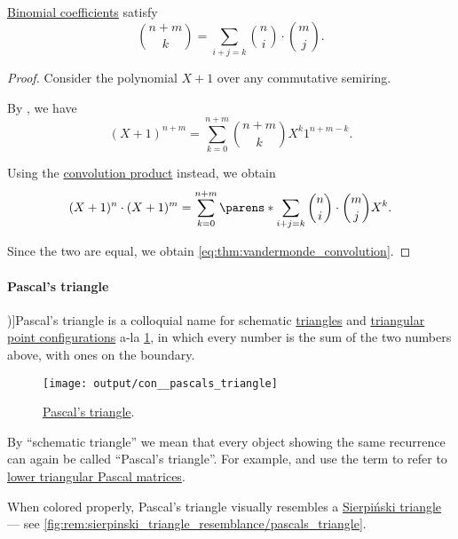 \begin{theorem}\label{thm:vandermonde_convolution}
  \hyperref[def:binomial_coefficient]{Binomial coefficients} satisfy
  \begin{equation}\label{eq:thm:vandermonde_convolution}
    \binom {n + m} k = \sum_{i+j=k} \binom n i \cdot \binom m j.
  \end{equation}
\end{theorem}
\begin{proof}
  Consider the polynomial \( X + 1 \) over any commutative semiring.

  By , we have
  \begin{equation*}
    (X + 1)^{n+m} = \sum_{k=0}^{n+m} \binom {n+m} k X^k 1^{n+m-k}.
  \end{equation*}

  Using the \hyperref[def:semigroup_algebra]{convolution product} instead, we obtain
  \begin{equation*}
    (X + 1)^n \cdot (X + 1)^m = \sum_{k=0}^{n+m} \parens*{ \sum_{i+j=k} \binom n i \cdot \binom m j } X^k.
  \end{equation*}

  Since the two are equal, we obtain \eqref{eq:thm:vandermonde_convolution}.
\end{proof}

\paragraph{Pascal's triangle}

\begin{concept}\label{con:pascals_triangle}
  \term[ru=треугольник Паскаля (\cite[\S 5.3.4]{Новиков2013ДискретнаяМатематика})]{Pascal's triangle} is a colloquial name for schematic \hyperref[def:triangle]{triangles} and \hyperref[def:triangular_point_configuration]{triangular point configurations} a-la \cref{fig:con:pascals_triangle}, in which every number is the sum of the two numbers above, with ones on the boundary.

  \begin{figure}[!ht]
    \centering
    \texttt{[image: output/con\_\_pascals\_triangle]}
    \caption{\hyperref[con:pascals_triangle]{Pascal's triangle}.}\label{fig:con:pascals_triangle}
  \end{figure}

  By \enquote{schematic triangle} we mean that every object showing the same recurrence can again be called \enquote{Pascal's triangle}. For example,  and  use the term to refer to \hyperref[def:pascal_matrix/lower]{lower triangular Pascal matrices}.
\end{concept}
\begin{comments}
  \item When colored properly, Pascal's triangle visually resembles a \hyperref[def:sierpinski_triangle]{Sierpi\'nski triangle} --- see \cref{fig:rem:sierpinski_triangle_resemblance/pascals_triangle}.
\end{comments}

